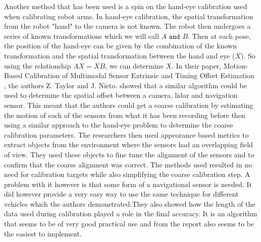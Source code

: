 Another method that has been used is a spin on the hand-eye calibration used when calibrating robot arms. In hand-eye calibration, the spatial transformation from the robot "hand" to the camera is not known. The robot then undergoes a series of known transformations which we will call \(A \texttt{ and } B\). Then at each pose, the position of the hand-eye can be given by the combination of the known transformation and the spatial transformation between the hand and eye (\(X\)).\newline
So using the relationship \(AX = XB\), we can determine \(X\).
In their paper, Motion-Based Calibration of Multimodal Sensor
Extrinsic and Timing Offset Estimation \cite{taylorMotionBasedCalibrationMultimodal2016}, the authors Z. Taylor and J. Nieto. showed that a similar algorithm could be used to determine the spatial offset between a camera, lidar and navigation sensor. This meant that the authors could get a coarse calibration by estimating the motion of each of the sensors from what it has been recording before then using a similar approach to the hand-eye problem to determine the coarse calibration parameters.\newline
The researchers then used appearance based metrics to extract objects from the environment where the sensors had an overlapping field of view. They used these objects to fine tune the alignment of the sensors and to confirm that the coarse alignment was correct. \newline
The methods used resulted in no need for calibration targets while also simplifying the coarse calibration step. A problem with it however is that some form of a navigational sensor is needed. It did however provide a very easy way to use the same technique for different vehicles which the authors demonstrated.They also showed how the length of the data used during calibration played a role in the final accuracy. It is an algorithm that seems to be of very good practical use and from the report also seems to be the easiest to implement.

